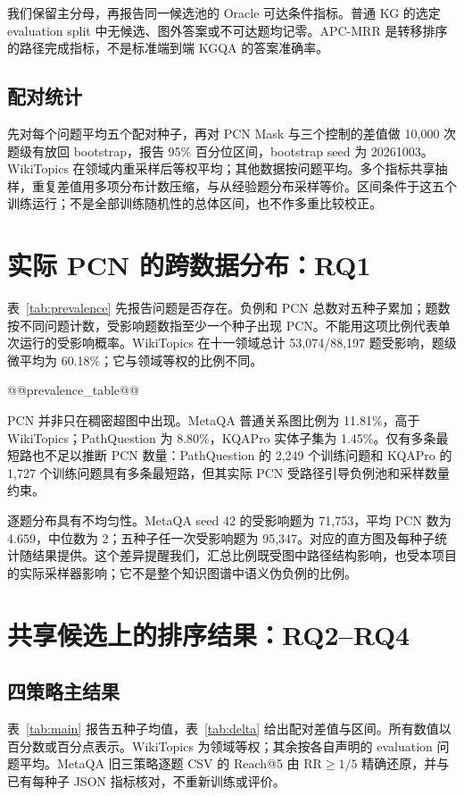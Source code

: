 \documentclass[UTF8,a4paper,10pt,fontset=fandol]{ctexart}
\begin{document}
我们保留主分母，再报告同一候选池的 Oracle 可达条件指标。普通 KG 的选定 evaluation split 中无候选、图外答案或不可达题均记零。APC-MRR 是转移排序的路径完成指标，不是标准端到端 KGQA 的答案准确率。

\subsection{配对统计}
先对每个问题平均五个配对种子，再对 PCN Mask 与三个控制的差值做 10,000 次题级有放回 bootstrap，报告 95\% 百分位区间，bootstrap seed 为 20261003。WikiTopics 在领域内重采样后等权平均；其他数据按问题平均。多个指标共享抽样，重复差值用多项分布计数压缩，与从经验题分布采样等价。区间条件于这五个训练运行；不是全部训练随机性的总体区间，也不作多重比较校正。

\section{实际 PCN 的跨数据分布：RQ1}
表~\ref{tab:prevalence} 先报告问题是否存在。负例和 PCN 总数对五种子累加；题数按不同问题计数，受影响题数指至少一个种子出现 PCN。不能用这项比例代表单次运行的受影响概率。WikiTopics 在十一领域总计 53,074/88,197 题受影响，题级微平均为 60.18\%；它与领域等权的比例不同。

@@prevalence_table@@

PCN 并非只在稠密超图中出现。MetaQA 普通关系图比例为 11.81\%，高于 WikiTopics；PathQuestion 为 8.80\%，KQAPro 实体子集为 1.45\%。仅有多条最短路也不足以推断 PCN 数量：PathQuestion 的 2,249 个训练问题和 KQAPro 的 1,727 个训练问题具有多条最短路，但其实际 PCN 受路径引导负例池和采样数量约束。

逐题分布具有不均匀性。MetaQA seed 42 的受影响题为 71,753，平均 PCN 数为 4.659，中位数为 2；五种子任一次受影响题为 95,347。对应的直方图及每种子统计随结果提供。这个差异提醒我们，汇总比例既受图中路径结构影响，也受本项目的实际采样器影响；它不是整个知识图谱中语义伪负例的比例。

\section{共享候选上的排序结果：RQ2--RQ4}
\subsection{四策略主结果}
表~\ref{tab:main} 报告五种子均值，表~\ref{tab:delta} 给出配对差值与区间。所有数值以百分数或百分点表示。WikiTopics 为领域等权；其余按各自声明的 evaluation 问题平均。MetaQA 旧三策略逐题 CSV 的 Reach@5 由 $\mathrm{RR}\ge1/5$ 精确还原，并与已有每种子 JSON 指标核对，不重新训练或评价。
\end{document}
